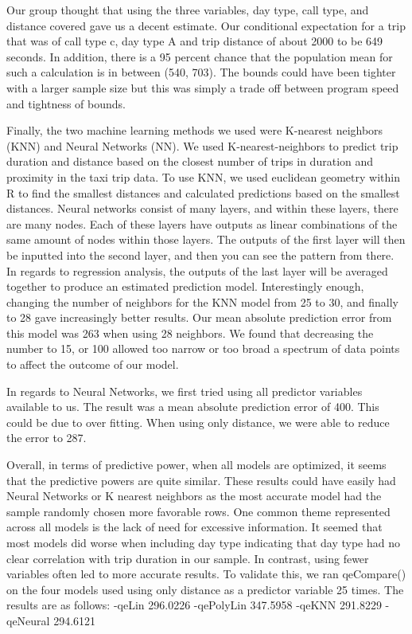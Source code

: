 \documentclass{article}
\begin{document}
Our group thought that using the three variables, day type, call type, and distance covered gave us a decent estimate. Our conditional expectation for a trip that was of call type c, day type A and trip distance of about 2000 to be 649 seconds. In addition, there is a 95 percent chance that the population mean for such a calculation is in between (540, 703). The bounds could have been tighter with a larger sample size but this was simply a trade off between program speed and tightness of bounds.

Finally, the two machine learning methods we used were K-nearest neighbors (KNN) and Neural Networks (NN). We used K-nearest-neighbors to predict trip duration and distance based on the closest number of trips in duration and proximity in the taxi trip data. To use KNN, we used euclidean geometry within R to find the smallest distances and calculated predictions based on the smallest distances. Neural networks consist of many layers, and within these layers, there are many nodes. Each of these layers have outputs as linear combinations of the same amount of nodes within those layers. The outputs of the first layer will then be inputted into the second layer, and then you can see the pattern from there. In regards to regression analysis, the outputs of the last layer will be averaged together to produce an estimated prediction model. Interestingly enough, changing the number of neighbors for the KNN model from 25 to 30, and finally to 28 gave increasingly better results. Our mean absolute prediction error from this model was 263 when using 28 neighbors. We found that decreasing the number to 15, or 100 allowed too narrow or too broad a spectrum of data points to affect the outcome of our model.

In regards to Neural Networks, we first tried using all predictor variables available to us. The result was a mean absolute prediction error of 400. This could be due to over fitting. When using only distance, we were able to reduce the error to 287.

Overall, in terms of predictive power, when all models are optimized, it seems that the predictive powers are quite similar. These results could have easily had Neural Networks or K nearest neighbors as the most accurate model had the sample randomly chosen more favorable rows. One common theme represented across all models is the lack of need for excessive information. It seemed that most models did worse when including day type indicating that day type had no clear correlation with trip duration in our sample. In contrast, using fewer variables often led to more accurate results. To validate this, we ran qeCompare() on the four models used using only distance as a predictor variable 25 times. The results are as follows: -qeLin 296.0226 -qePolyLin 347.5958 -qeKNN 291.8229 -qeNeural 294.6121
\end{document}
